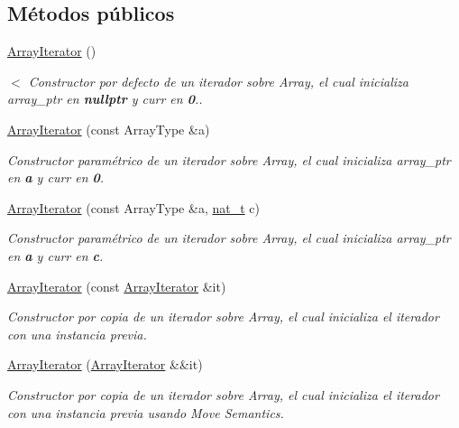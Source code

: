 \subsection*{Métodos públicos}
\begin{DoxyCompactItemize}
\item 
\hyperlink{class_designar_1_1_array_iterator_a0fd19f5e2f3f3c13470d62b118575582}{Array\+Iterator} ()
\begin{DoxyCompactList}\small\item\em $<$ Constructor por defecto de un iterador sobre Array, el cual inicializa array\+\_\+ptr en {\bfseries nullptr} y {\itshape curr} en {\bfseries 0}.. \end{DoxyCompactList}\item 
\hyperlink{class_designar_1_1_array_iterator_a7d5565949d8cd3100686c1ff73eb1618}{Array\+Iterator} (const Array\+Type \&a)
\begin{DoxyCompactList}\small\item\em Constructor paramétrico de un iterador sobre Array, el cual inicializa array\+\_\+ptr en {\bfseries a} y {\itshape curr} en {\bfseries 0}. \end{DoxyCompactList}\item 
\hyperlink{class_designar_1_1_array_iterator_a1c9df0412f7bb1dabbd15f6772d8b9a3}{Array\+Iterator} (const Array\+Type \&a, \hyperlink{namespace_designar_aa72662848b9f4815e7bf31a7cf3e33d1}{nat\+\_\+t} c)
\begin{DoxyCompactList}\small\item\em Constructor paramétrico de un iterador sobre Array, el cual inicializa array\+\_\+ptr en {\bfseries a} y {\itshape curr} en {\bfseries c}. \end{DoxyCompactList}\item 
\hyperlink{class_designar_1_1_array_iterator_a7d3069da40d921310097dbde17fb0204}{Array\+Iterator} (const \hyperlink{class_designar_1_1_array_iterator}{Array\+Iterator} \&it)
\begin{DoxyCompactList}\small\item\em Constructor por copia de un iterador sobre Array, el cual inicializa el iterador con una instancia previa. \end{DoxyCompactList}\item 
\hyperlink{class_designar_1_1_array_iterator_ad27f115766207137bd74ef47d477f4f5}{Array\+Iterator} (\hyperlink{class_designar_1_1_array_iterator}{Array\+Iterator} \&\&it)
\begin{DoxyCompactList}\small\item\em Constructor por copia de un iterador sobre Array, el cual inicializa el iterador con una instancia previa usando Move Semantics. \end{DoxyCompactList}\item 

\end{DoxyCompactItemize}
